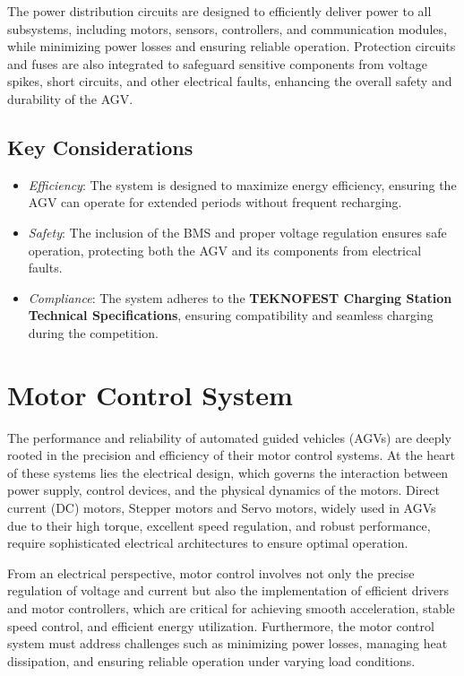 \documentclass[../../main]{subfiles}
\begin{document}
The power distribution circuits are designed to efficiently deliver power to all 
subsystems, including motors, sensors, controllers, and communication 
modules, while minimizing power losses and ensuring reliable operation. 
Protection circuits and fuses are also integrated to safeguard sensitive 
components from voltage spikes, short circuits, and other electrical faults, 
enhancing the overall safety and durability of the AGV.
\newpage
\subsection{Key Considerations}%
\begin{itemize}
    \item \textit{Efficiency}: The system is designed to maximize 
    energy efficiency, ensuring the AGV can operate for extended 
    periods without frequent recharging.
    \item \textit{Safety}: The inclusion of the BMS and proper voltage 
    regulation ensures safe operation, protecting both the AGV and its 
    components from electrical faults.
    \item \textit{Compliance}: The system adheres to the \textbf{TEKNOFEST 
    Charging Station Technical Specifications}, ensuring compatibility 
    and seamless charging during the competition.
\end{itemize}


\section{Motor Control System}

The performance and reliability of automated guided vehicles (AGVs) are deeply rooted in the precision and efficiency of
their motor control systems\cite{cservenak2018further}. At the heart of these systems lies the electrical design, which governs the interaction 
between power supply, control devices, and the physical dynamics of the motors. Direct current (DC) motors\cite{OrientalMotorAGV}, Stepper motors\cite{LinEngineering_AGV} and Servo motors\cite{AMC_AGV_Benefits}, widely 
used in AGVs due to their high torque, excellent speed regulation, and robust performance, require sophisticated electrical 
architectures to ensure optimal operation. 

From an electrical perspective, motor control involves not only the precise regulation of voltage and current but 
also the implementation of efficient drivers and motor controllers, which are critical for achieving smooth acceleration, 
stable speed control, and efficient energy utilization. Furthermore, the motor control system must address challenges 
such as minimizing power losses, managing heat dissipation, and ensuring reliable operation under varying load conditions. 
\end{document}

